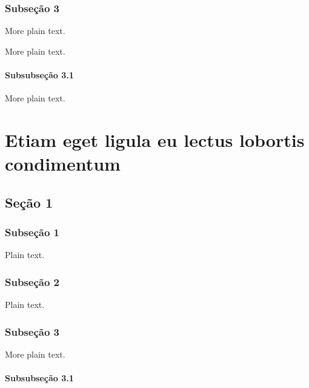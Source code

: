 \documentclass{abntex2}
\begin{document}
\subsection{Subseção 3}

More plain text.

\lipsum[16-20]

More plain text.

\subsubsection{Subsubseção 3.1}

More plain text.

\lipsum[21-25]




\chapter{Etiam eget ligula eu lectus lobortis condimentum}

\lipsum[1-3]

\section{Seção 1}

\lipsum[4-5]

\subsection{Subseção 1}

Plain text.

\lipsum[6-10]

\subsection{Subseção 2}

Plain text.

\lipsum[11-15]

\subsection{Subseção 3}

More plain text.

\lipsum[16-17]

\subsubsection{Subsubseção 3.1}
\end{document}
